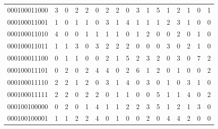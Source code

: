 \documentclass[10pt,a4paper]{article}
\begin{document}
\begin{longtable}{ |c|c|c|c|c|c|c|c|c|c|c|c|c|c|c|c|c| }
    000100011000              & 3                            & 0                                & 2                            & 2                              & 0   & 2   & 2   & 0   & 3   & 1   & 5   & 1   & 2   & 1   & 0   & 1   \\
    000100011001              & 1                            & 0                                & 1                            & 1                              & 0   & 3   & 1   & 4   & 1   & 1   & 1   & 2   & 3   & 1   & 0   & 0   \\
    000100011010              & 4                            & 0                                & 0                            & 1                              & 1   & 1   & 1   & 0   & 1   & 2   & 0   & 0   & 2   & 0   & 1   & 0   \\
    000100011011              & 1                            & 1                                & 3                            & 0                              & 3   & 2   & 2   & 2   & 0   & 0   & 0   & 3   & 0   & 2   & 1   & 0   \\
    000100011100              & 0                            & 1                                & 1                            & 0                              & 0   & 2   & 1   & 5   & 2   & 3   & 2   & 0   & 3   & 0   & 7   & 2   \\
    000100011101              & 0                            & 2                                & 0                            & 2                              & 4   & 4   & 0   & 2   & 6   & 1   & 2   & 0   & 1   & 0   & 0   & 2   \\
    000100011110              & 2                            & 2                                & 1                            & 2                              & 0   & 3   & 1   & 4   & 0   & 3   & 0   & 1   & 0   & 3   & 1   & 0   \\
    000100011111              & 2                            & 2                                & 0                            & 2                              & 2   & 0   & 1   & 1   & 0   & 0   & 5   & 1   & 1   & 4   & 0   & 2   \\
    000100100000              & 0                            & 2                                & 0                            & 1                              & 4   & 1   & 1   & 2   & 2   & 3   & 5   & 1   & 2   & 1   & 3   & 0   \\
    000100100001              & 1                            & 1                                & 2                            & 2                              & 4   & 0   & 1   & 0   & 0   & 2   & 0   & 4   & 4   & 2   & 0   & 0   \\

\end{longtable}
\end{document}
